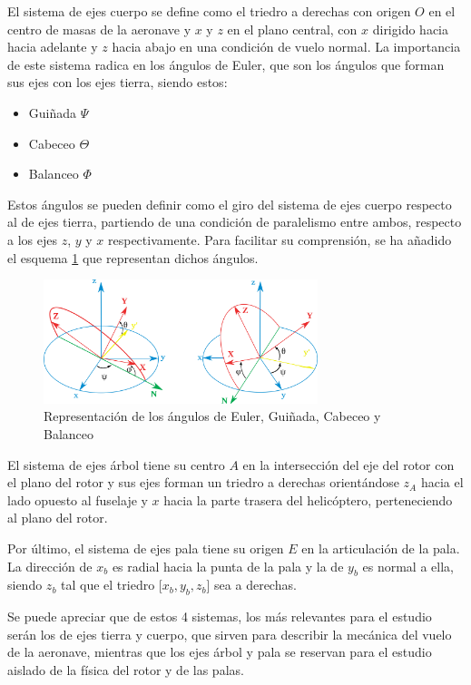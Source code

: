 El sistema de ejes cuerpo se define como el triedro a derechas con origen $O$ en el centro de masas de la aeronave y $x$ y $z$ en el plano central, con $x$ dirigido hacia hacia adelante y $z$ hacia abajo en una condición de vuelo normal. La importancia de este sistema radica en los ángulos de Euler, que son los ángulos que forman sus ejes con los ejes tierra, siendo estos:
\begin{itemize}
	\item Guiñada $\Psi$
	\item Cabeceo $\Theta$
	\item Balanceo $\Phi$
\end{itemize}
Estos ángulos se pueden definir como el giro del sistema de ejes cuerpo respecto al de ejes tierra, partiendo de una condición de paralelismo entre ambos, respecto a los ejes $z$, $y$ y $x$ respectivamente. Para facilitar su comprensión, se ha añadido el esquema \ref{AEuler} que representan dichos ángulos.
\begin{figure}
	\centering
	\includegraphics[width=80mm]{imagenes/AEuler}
	\caption{Representación de los ángulos de Euler, Guiñada, Cabeceo y Balanceo}
	\label{AEuler}
\end{figure}

El sistema de ejes árbol tiene su centro $A$ en la intersección del eje del rotor con el plano del rotor y sus ejes forman un triedro a derechas orientándose $z_{A}$ hacia el lado opuesto al fuselaje y $x$ hacia la parte trasera del helicóptero, perteneciendo al plano del rotor.

Por último, el sistema de ejes pala tiene su origen $E$ en la articulación de la pala. La dirección de $x_{b}$ es radial hacia la punta de la pala y la de $y_{b}$ es normal a ella, siendo $z_{b}$ tal que el triedro [$x_{b},y_{b},z_{b}$] sea a derechas.

Se puede apreciar que de estos 4 sistemas, los más relevantes para el estudio serán los de ejes tierra y cuerpo, que sirven para describir la mecánica del vuelo de la aeronave, mientras que los ejes árbol y pala se reservan para el estudio aislado de la física del rotor y de las palas.\

